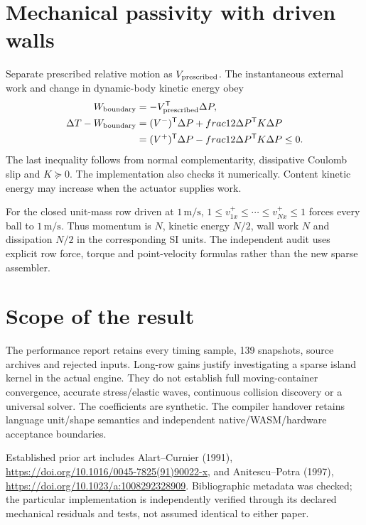 \documentclass[11pt]{article}
\begin{document}
\section{Mechanical passivity with driven walls}
Separate prescribed relative motion as $V_{\rm prescribed}$. The instantaneous
external work and change in dynamic-body kinetic energy obey
\begin{align}
 W_{\rm boundary}&=-V_{\rm prescribed}^{\mathsf T}\Delta P,\\
 \Delta T-W_{\rm boundary}
 &= (V^-)^{\mathsf T}\Delta P+	frac12\Delta P^{\mathsf T}K\Delta P\\
 &= (V^+)^{\mathsf T}\Delta P-	frac12\Delta P^{\mathsf T}K\Delta P\leq0.
\end{align}
The last inequality follows from normal complementarity, dissipative Coulomb
slip and $K\succeq0$. The implementation also checks it numerically. Content
kinetic energy may increase when the actuator supplies work.

For the closed unit-mass row driven at $1\,\mathrm{m/s}$,
$1\leq v_{1x}^+\leq\cdots\leq v_{Nx}^+\leq1$ forces every ball to $1\,\mathrm{m/s}$.
Thus momentum is $N$, kinetic energy $N/2$, wall work $N$ and dissipation $N/2$
in the corresponding SI units. The independent audit uses explicit row force,
torque and point-velocity formulas rather than the new sparse assembler.

\section{Scope of the result}
The performance report retains every timing sample, 139 snapshots, source archives
and rejected inputs. Long-row gains justify investigating a sparse island kernel
in the actual engine. They do not establish full moving-container convergence,
accurate stress/elastic waves, continuous collision discovery or a universal
solver. The coefficients are synthetic. The compiler handover retains language
unit/shape semantics and independent native/WASM/hardware acceptance boundaries.

Established prior art includes Alart--Curnier (1991),
\url{https://doi.org/10.1016/0045-7825(91)90022-x}, and Anitescu--Potra (1997),
\url{https://doi.org/10.1023/a:1008292328909}. Bibliographic metadata was checked;
the particular implementation is independently verified through its declared
mechanical residuals and tests, not assumed identical to either paper.
\end{document}
